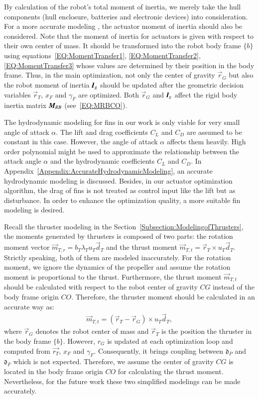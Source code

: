 By calculation of the robot's total moment of inertia, we merely take the hull components (hull enclosure, batteries and electronic devices) into consideration. For a more accurate modeling , the actuator moment of inertia should also be considered. Note that the moment of inertia for actuators is given with respect to their own center of mass. It should be transformed into the robot body frame $\lbrace b \rbrace$ using equations~\ref{EQ:MomentTransfer1}, \ref{EQ:MomentTransfer2}, \ref{EQ:MomentTransfer3} whose values are determined by their position in the body frame. Thus, in the main 
optimization, not only the center of gravity $\vec{r}_{G}$ but also the robot moment of inertia $\emph{\textbf{I}}_{g}$ should be updated after the geometric decision variables $\vec{r}_{T}$, $x_{F}$ and $\gamma_{F}$ are optimized. Both $\vec{r}_{G}$ and $\emph{\textbf{I}}_{g}$ affect the rigid body inertia matrix $\emph{\textbf{M}}_{RB}$ (see~\ref{EQ:MRBCO}). 

The hydrodynamic modeling for fins in our work is only viable for very small angle of attack $\alpha$. The lift and drag coefficients $C_{L}$ and $C_{D}$ are assumed to be constant in this case. However, the angle of attack $\alpha$ affects them heavily. High order polynomial might be used to approximate the relationship between the attack angle $\alpha$ and the hydrodynamic coefficients $C_{L}$ and $C_{D}$. In Appendix~\ref{Appendix:AccurateHydrodynamicModeling}, an accurate hydrodynamic modeling is discussed. Besides, in our actuator optimization algorithm, the drag of fins is not treated as control input like the lift but as disturbance. In order to enhance the optimization quality, a more suitable fin modeling is desired.

Recall the thruster modeling in the Section~\ref{Subsection:ModelingofThrusters}, the moments generated by thrusters is composed of two parts: the rotation moment vector $\vec{m}_{T,r}=b_{T}\lambda_{T} u_{T}\vec{d}_{T}$ and the thrust moment $\vec{m}_{T,t}=\vec{r}_{T}\times u_{T}\vec{d}_{T}$. Strictly speaking, both of them are modeled inaccurately. For the rotation moment, we ignore the dynamics of the propeller and assume the rotation moment is proportional to the thrust. Furthermore, the thrust moment $\vec{m}_{T,t}$ should be calculated with respect to the robot center of gravity $CG$ instead of the body frame origin $CO$. Therefore, the thruster moment should be calculated in an accurate way as:
\begin{align}
\vec{m}_{T,t}=(\vec{r}_{T}-\vec{r}_{G})\times u_{T}\vec{d}_{T},
\end{align}
where $\vec{r}_{G}$ denotes the robot center of mass and $\vec{r}_{T}$ is the position the thruster in the body frame $\lbrace b \rbrace$. However, $r_{G}$ is updated at each optimization loop and computed from $\vec{r_{T}}$, $x_{F}$ and $\gamma_{F}$. Consequently, it brings coupling between $\mathfrak{d}_{P}$ and $\mathfrak{d}_{F}$ which is not expected. Therefore, we assume the center of gravity $CG$ is located in the body frame origin $CO$ for calculating the thrust moment. Nevertheless, for the future work these two simplified modelings can be made accurately. 


